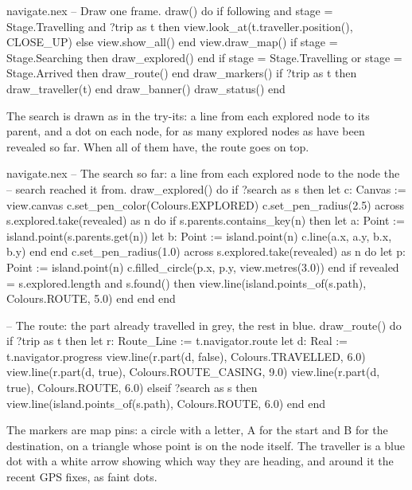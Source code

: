 \begin{continued}{navigate.nex}
  -- Draw one frame.
  draw() do
    if following and stage = Stage.Travelling and ?trip as t then
      view.look_at(t.traveller.position(), CLOSE_UP)
    else
      view.show_all()
    end
    view.draw_map()
    if stage = Stage.Searching then
      draw_explored()
    end
    if stage = Stage.Travelling or stage = Stage.Arrived then
      draw_route()
    end
    draw_markers()
    if ?trip as t then
      draw_traveller(t)
    end
    draw_banner()
    draw_status()
  end
\end{continued}

The search is drawn as in the try-its: a line from each explored node to
its parent, and a dot on each node, for as many explored nodes as have been
revealed so far. When all of them have, the route goes on top.

\begin{continued}{navigate.nex}
  -- The search so far: a line from each explored node to the node the
  -- search reached it from.
  draw_explored() do
    if ?search as s then
      let c: Canvas := view.canvas
      c.set_pen_color(Colours.EXPLORED)
      c.set_pen_radius(2.5)
      across s.explored.take(revealed) as n do
        if s.parents.contains_key(n) then
          let a: Point := island.point(s.parents.get(n))
          let b: Point := island.point(n)
          c.line(a.x, a.y, b.x, b.y)
        end
      end
      c.set_pen_radius(1.0)
      across s.explored.take(revealed) as n do
        let p: Point := island.point(n)
        c.filled_circle(p.x, p.y, view.metres(3.0))
      end
      if revealed = s.explored.length and s.found() then
        view.line(island.points_of(s.path), Colours.ROUTE, 5.0)
      end
    end
  end

  -- The route: the part already travelled in grey, the rest in blue.
  draw_route() do
    if ?trip as t then
      let r: Route_Line := t.navigator.route
      let d: Real := t.navigator.progress
      view.line(r.part(d, false), Colours.TRAVELLED, 6.0)
      view.line(r.part(d, true), Colours.ROUTE_CASING, 9.0)
      view.line(r.part(d, true), Colours.ROUTE, 6.0)
    elseif ?search as s then
      view.line(island.points_of(s.path), Colours.ROUTE, 6.0)
    end
  end
\end{continued}

The markers are map pins: a circle with a letter, A for the start and B for
the destination, on a triangle whose point is on the node itself. The
traveller is a blue dot with a white arrow showing which way they are
heading, and around it the recent GPS fixes, as faint dots.

